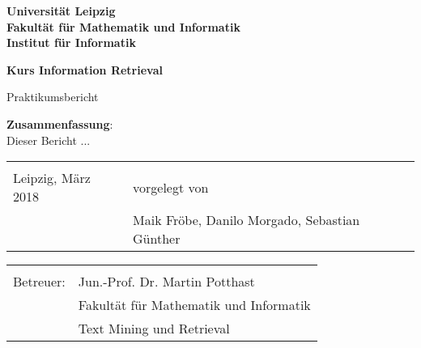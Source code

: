 \documentclass[a4paper,ngerman,twoside,BCOR1.5cm,headsepline,DIV12,appendixprefix,final,12pt]{scrartcl}
\begin{document}
\thispagestyle{empty}

\begin{center}
\large

\vspace{1cm}
\textbf{\sffamily	Universität Leipzig\\
			Fakultät für Mathematik und Informatik\\
			Institut für Informatik\\}

\vspace{2cm}
{\Large\textbf{\sffamily Kurs Information Retrieval}}


\large

Praktikumsbericht
\vspace{1cm}
\end{center}

\textbf{Zusammenfassung}:\\
Dieser Bericht ...

\vfill

{\large
\begin{tabular}{p{7cm} l}
&\\
\small
Leipzig, März 2018 		& \small vorgelegt von\\
				& \small Maik Fröbe, Danilo Morgado, Sebastian Günther\\
\end{tabular}}

\begin{tabular}{p{7cm} l}
&\\
\small
Betreuer: 	& \small Jun.-Prof. Dr. Martin Potthast \\
				& \small Fakultät für Mathematik und Informatik\\
				& \small Text Mining und Retrieval
\end{tabular}


\newpage


\newpage


\newpage


\newpage


\newpage
{}


\end{document}
